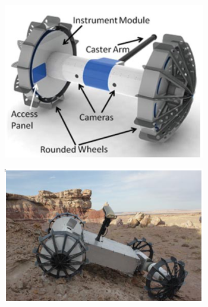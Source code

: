 \documentclass[12pt]{article}
\begin{document}
\begin{figure}
  \vspace{-0.2in}
  \begin{subfigure}{.245\textwidth}
    \centering
    \includegraphics[width=.75\linewidth]{axel_prototype}
    \caption{}
    \label{fig:axel}
  \end{subfigure}%
  \begin{subfigure}{.245\textwidth}
    \centering
    \includegraphics[width=.95\linewidth]{duaxel_prototype}
    \caption{}
    \label{fig:duaxel}
  \end{subfigure}
  \begin{subfigure}{.245\textwidth}
    \centering

\end{subfigure}
\end{figure}
\end{document}
